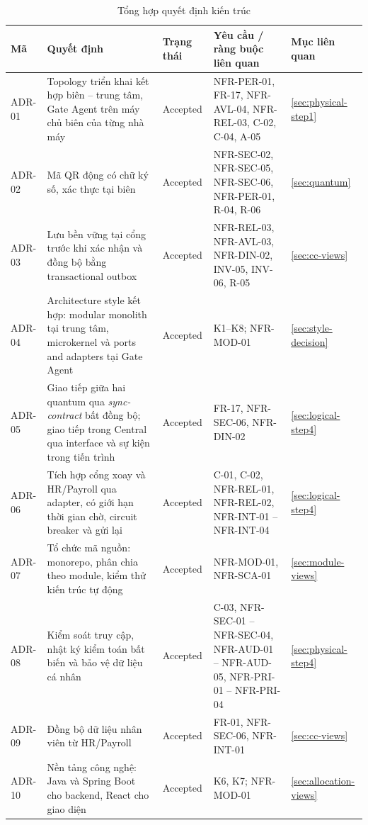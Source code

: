 \begin{table}[H]
\centering
\caption{Tổng hợp quyết định kiến trúc}\label{tab:adr-summary}
\small
\renewcommand{\arraystretch}{1.3}
\begin{tabularx}{\textwidth}{|>{\centering\arraybackslash}p{1.4cm}|>{\raggedright\arraybackslash}X|>{\centering\arraybackslash}p{1.7cm}|>{\raggedright\arraybackslash}p{4.4cm}|>{\centering\arraybackslash}p{1.6cm}|}
\hline
\textbf{Mã} & \textbf{Quyết định} & \textbf{Trạng thái} & \textbf{Yêu cầu / ràng buộc liên quan} & \textbf{Mục liên quan} \\
\hline
ADR-01 & Topology triển khai kết hợp biên -- trung tâm, Gate Agent trên máy chủ biên của từng nhà máy & Accepted & NFR-PER-01, FR-17, NFR-AVL-04, NFR-REL-03, C-02, C-04, A-05 & \ref{sec:physical-step1} \\
\hline
ADR-02 & Mã QR động có chữ ký số, xác thực tại biên & Accepted & NFR-SEC-02, NFR-SEC-05, NFR-SEC-06, NFR-PER-01, R-04, R-06 & \ref{sec:quantum} \\
\hline
ADR-03 & Lưu bền vững tại cổng trước khi xác nhận và đồng bộ bằng transactional outbox & Accepted & NFR-REL-03, NFR-AVL-03, NFR-DIN-02, INV-05, INV-06, R-05 & \ref{sec:cc-views} \\
\hline
ADR-04 & Architecture style kết hợp: modular monolith tại trung tâm, microkernel và ports and adapters tại Gate Agent & Accepted & K1--K8; NFR-MOD-01 & \ref{sec:style-decision} \\
\hline
ADR-05 & Giao tiếp giữa hai quantum qua \textit{sync-contract} bất đồng bộ; giao tiếp trong Central qua interface và sự kiện trong tiến trình & Accepted & FR-17, NFR-SEC-06, NFR-DIN-02 & \ref{sec:logical-step4} \\
\hline
ADR-06 & Tích hợp cổng xoay và HR/Payroll qua adapter, có giới hạn thời gian chờ, circuit breaker và gửi lại & Accepted & C-01, C-02, NFR-REL-01, NFR-REL-02, NFR-INT-01 -- NFR-INT-04 & \ref{sec:logical-step4} \\
\hline
ADR-07 & Tổ chức mã nguồn: monorepo, phân chia theo module, kiểm thử kiến trúc tự động & Accepted & NFR-MOD-01, NFR-SCA-01 & \ref{sec:module-views} \\
\hline
ADR-08 & Kiểm soát truy cập, nhật ký kiểm toán bất biến và bảo vệ dữ liệu cá nhân & Accepted & C-03, NFR-SEC-01 -- NFR-SEC-04, NFR-AUD-01 -- NFR-AUD-05, NFR-PRI-01 -- NFR-PRI-04 & \ref{sec:physical-step4} \\
\hline
ADR-09 & Đồng bộ dữ liệu nhân viên từ HR/Payroll & Accepted & FR-01, NFR-SEC-06, NFR-INT-01 & \ref{sec:cc-views} \\
\hline
ADR-10 & Nền tảng công nghệ: Java và Spring Boot cho backend, React cho giao diện & Accepted & K6, K7; NFR-MOD-01 & \ref{sec:allocation-views} \\
\hline
\end{tabularx}
\end{table}

